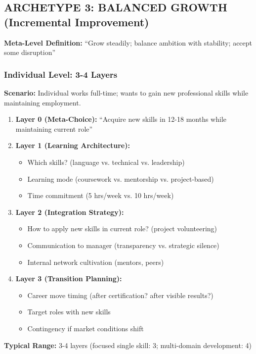 \documentclass[11pt, a4paper]{article}
\begin{document}
\subsection{ARCHETYPE 3: BALANCED GROWTH (Incremental Improvement)}

\textbf{Meta-Level Definition:} ``Grow steadily; balance ambition with stability; accept some disruption''

\subsubsection{Individual Level: 3-4 Layers}

\begin{tcolorbox}[colback=gray!5!white, colframe=gray!75!black, title=Example: Career Development (e.g., Skill Enhancement)]

\textbf{Scenario:} Individual works full-time; wants to gain new professional skills while maintaining employment.

\begin{enumerate}
    \item \textbf{Layer 0 (Meta-Choice):} ``Acquire new skills in 12-18 months while maintaining current role''

    \item \textbf{Layer 1 (Learning Architecture):}
    \begin{itemize}[nosep]
        \item Which skills? (language vs. technical vs. leadership)
        \item Learning mode (coursework vs. mentorship vs. project-based)
        \item Time commitment (5 hrs/week vs. 10 hrs/week)
    \end{itemize}

    \item \textbf{Layer 2 (Integration Strategy):}
    \begin{itemize}[nosep]
        \item How to apply new skills in current role? (project volunteering)
        \item Communication to manager (transparency vs. strategic silence)
        \item Internal network cultivation (mentors, peers)
    \end{itemize}

    \item \textbf{Layer 3 (Transition Planning):}
    \begin{itemize}[nosep]
        \item Career move timing (after certification? after visible results?)
        \item Target roles with new skills
        \item Contingency if market conditions shift
    \end{itemize}
\end{enumerate}

\textbf{Typical Range:} 3-4 layers (focused single skill: 3; multi-domain development: 4)

\end{tcolorbox}
\end{document}
